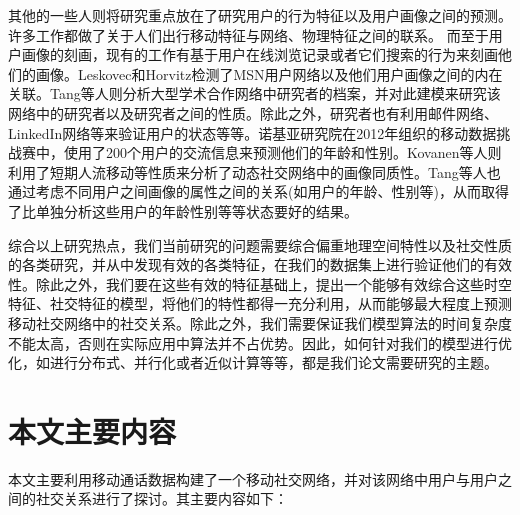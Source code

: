 其他的一些人则将研究重点放在了研究用户的行为特征以及用户画像之间的预测。许多工作都做了关于人们出行移动特征与网络、物理特征之间的联系。 而至于用户画像的刻画，现有的工作有基于用户在线浏览记录或者它们搜索的行为来刻画他们的画像。Leskovec和Horvitz检测了MSN用户网络以及他们用户画像之间的内在关联。Tang等人则分析大型学术合作网络中研究者的档案，并对此建模来研究该网络中的研究者以及研究者之间的性质。除此之外，研究者也有利用邮件网络、LinkedIn网络等来验证用户的状态等等。诺基亚研究院在2012年组织的移动数据挑战赛中，使用了200个用户的交流信息来预测他们的年龄和性别。Kovanen等人则利用了短期人流移动等性质来分析了动态社交网络中的画像同质性。Tang等人也通过考虑不同用户之间画像的属性之间的关系(如用户的年龄、性别等)，从而取得了比单独分析这些用户的年龄性别等等状态要好的结果。


综合以上研究热点，我们当前研究的问题需要综合偏重地理空间特性以及社交性质的各类研究，并从中发现有效的各类特征，在我们的数据集上进行验证他们的有效性。除此之外，我们要在这些有效的特征基础上，提出一个能够有效综合这些时空特征、社交特征的模型，将他们的特性都得一充分利用，从而能够最大程度上预测移动社交网络中的社交关系。除此之外，我们需要保证我们模型算法的时间复杂度不能太高，否则在实际应用中算法并不占优势。因此，如何针对我们的模型进行优化，如进行分布式、并行化或者近似计算等等，都是我们论文需要研究的主题。







\section{本文主要内容}

本文主要利用移动通话数据构建了一个移动社交网络，并对该网络中用户与用户之间的社交关系进行了探讨。其主要内容如下：

